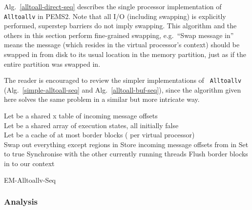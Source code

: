 \documentclass[12pt]{carletoncsthesis}
\begin{document}
Alg.~\ref{alltoall-direct-seq} describes the single processor implementation of
{\tt Alltoallv} in PEMS2.  Note that all I/O (including swapping) is explicitly
performed, superstep barriers do not imply swapping.  This algorithm and the
others in this section perform fine-grained swapping, e.g.\ ``Swap message
in'' means the message (which resides in the virtual processor's context)
should be swapped in from disk to its usual location in the memory partition,
just as if the entire partition was swapped in.

The reader is encouraged to review the simpler implementations of {\tt
Alltoallv} (Alg.~\ref{simple-alltoall-seq} and Alg.~\ref{alltoall-buf-seq}),
since the algorithm given here solves the same problem in a similar but more
intricate way.

\begin{algorithm}[ht]
\BlankLine
Let  be a shared  x  table of incoming message offsets\\
Let  be a shared array of  execution states, all initially false\\
Let  be a cache of at most  border blocks ( per virtual processor)\\
\BlankLine
{}
	Swap out everything except regions in \;
	Store incoming message offsets from  in 
		\;
	Set  to true\;
	Synchronise with the  other currently running threads\;
\BlankLine{}
\BlankLine{}
\BlankLine
{}
\BlankLine{}
\BlankLine
{}
	Flush border blocks in  to our context\;
\BlankLine{}\BlankLine
\caption{{\sc EM-Alltoallv-Seq}}
\label{alltoall-direct-seq}
\end{algorithm}

\clearpage
\subsubsection{Analysis}
\end{document}
